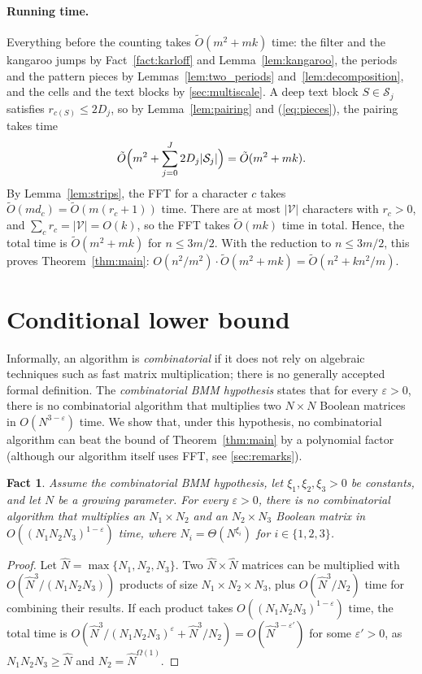 \documentclass[11pt]{article}
\newtheorem{fact}[theorem]{Fact}
\theoremstyle{definition}
\newcommand{\tO}{\tilde{O}}
\renewcommand{\O}{O}
\newcommand{\cS}{\mathcal{S}}
\newcommand{\cV}{\mathcal{V}}
\newcommand{\abs}[1]{\lvert #1 \rvert}
\begin{document}
\paragraph{Running time.} Everything before the counting takes $\tO(m^2 + mk)$ time: the filter and the kangaroo jumps by Fact~\ref{fact:karloff} and Lemma~\ref{lem:kangaroo}, the periods and the pattern pieces by Lemmas~\ref{lem:two_periods} and~\ref{lem:decomposition}, and the cells and the text blocks by \autoref{sec:multiscale}.
A deep text block $S \in \cS_j$ satisfies $r_{c(S)} \le 2D_j$, so by Lemma~\ref{lem:pairing} and (\ref{eq:pieces}), the pairing takes time
\[ \tO\Bigl(m^2 + \sum_{j=0}^{J} 2D_j \abs{\cS_j}\Bigr) = \tO(m^2 + mk). \]
By Lemma~\ref{lem:strips}, the FFT for a character $c$ takes $\tO(md_c) = \tO(m(r_c + 1))$ time.
There are at most $\abs{\cV}$ characters with $r_c > 0$, and $\sum_c r_c = \abs{\cV} = \O(k)$, so the FFT takes $\tO(mk)$ time in total.
Hence, the total time is $\tO(m^2 + mk)$ for $n \le 3m/2$.
With the reduction to $n \le 3m/2$, this proves Theorem~\ref{thm:main}: $\O(n^2/m^2) \cdot \tO(m^2 + mk) = \tO(n^2 + kn^2/m)$.

\section{Conditional lower bound}\label{sec:lower}

Informally, an algorithm is \emph{combinatorial} if it does not rely on algebraic techniques such as fast matrix multiplication; there is no generally accepted formal definition.
The \emph{combinatorial BMM hypothesis} states that for every $\varepsilon > 0$, there is no combinatorial algorithm that multiplies two $N \times N$ Boolean matrices in $\O(N^{3-\varepsilon})$ time.
We show that, under this hypothesis, no combinatorial algorithm can beat the bound of Theorem~\ref{thm:main} by a polynomial factor (although our algorithm itself uses FFT, see \autoref{sec:remarks}).

\begin{fact}\label{fact:rect}
Assume the combinatorial BMM hypothesis, let $\xi_1, \xi_2, \xi_3 > 0$ be constants, and let $N$ be a growing parameter.
For every $\varepsilon > 0$, there is no combinatorial algorithm that multiplies an $N_1 \times N_2$ and an $N_2 \times N_3$ Boolean matrix in $\O((N_1N_2N_3)^{1-\varepsilon})$ time, where $N_i = \Theta(N^{\xi_i})$ for $i \in \{1,2,3\}$.
\end{fact}
\begin{proof}
Let $\hat N = \max\{N_1, N_2, N_3\}$.
Two $\hat N \times \hat N$ matrices can be multiplied with $\O(\hat N^3/(N_1N_2N_3))$ products of size $N_1 \times N_2 \times N_3$, plus $\O(\hat N^3/N_2)$ time for combining their results.
If each product takes $\O((N_1N_2N_3)^{1-\varepsilon})$ time, the total time is $\O(\hat N^3/(N_1N_2N_3)^{\varepsilon} + \hat N^3/N_2) = \O(\hat N^{3 - \varepsilon'})$ for some $\varepsilon' > 0$, as $N_1N_2N_3 \ge \hat N$ and $N_2 = \hat N^{\Omega(1)}$.
\end{proof}
\end{document}
